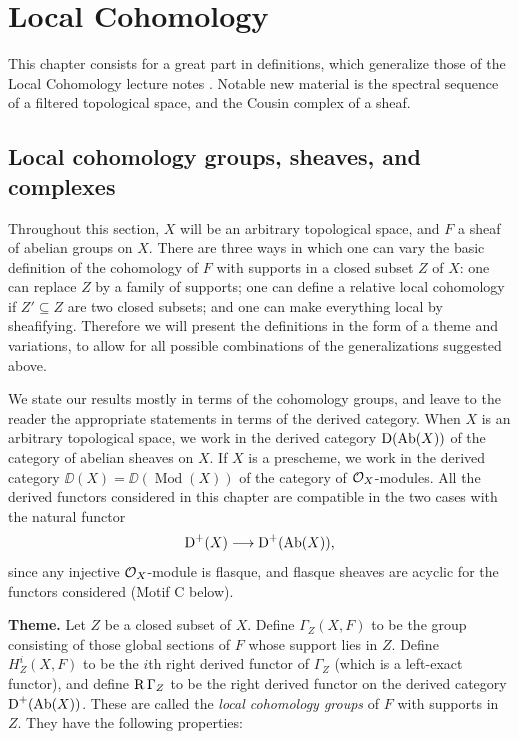 
\chapter{Local Cohomology}
\begingroup
\setlength{\emergencystretch}{2em}

This chapter consists for a great part in definitions, which generalize those of the Local Cohomology lecture notes \cite{LC}. Notable new material is the spectral sequence of a filtered topological space, and the Cousin complex of a sheaf.

\section{Local cohomology groups, sheaves, and complexes}\label{sec:4.1}

Throughout this section, $X$ will be an arbitrary topological space, and $F$ a sheaf of abelian groups on $X$. There are three ways in which one can vary the basic definition of the cohomology of $F$ with supports in a closed subset $Z$ of $X$: one can replace $Z$ by a family of supports; one can define a relative local cohomology if $Z'\subseteq Z$ are two closed subsets; and one can make everything local by sheafifying. Therefore we will present the definitions in the form of a theme and variations, to allow for all possible combinations of the generalizations suggested above.

We state our results mostly in terms of the cohomology groups, and leave to the reader the appropriate statements in terms of the derived category. When $X$ is an arbitrary topological space, we work in the derived category $\operatorname{D}(\operatorname{Ab}(X))$ of the category of abelian sheaves on $X$. If $X$ is a prescheme, we work in the derived category $\DD(X)=\DD(\operatorname{Mod}(X))$ of the category of $\mathcal{O}_X$-modules. All the derived functors considered in this chapter are compatible in the two cases with the natural functor
\[
\operatorname{D}^+(X)\longrightarrow \operatorname{D}^+(\operatorname{Ab}(X)),
\]
since any injective $\mathcal{O}_X$-module is flasque, and flasque sheaves are acyclic for the functors considered (Motif C below).

\medskip\noindent\textbf{Theme.}
Let $Z$ be a closed subset of $X$. Define $\Gamma_Z(X,F)$ to be the group consisting of those global sections of $F$ whose support lies in $Z$. Define $H_Z^i(X,F)$ to be the $i$th right derived functor of $\Gamma_Z$ (which is a left-exact functor), and define $\operatorname{R}\Gamma_Z$ to be the right derived functor on the derived category $\operatorname{D}^+(\operatorname{Ab}(X))$. These are called the \emph{local cohomology groups} of $F$ with supports in $Z$. They have the following properties:

